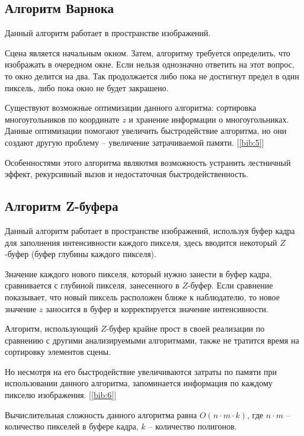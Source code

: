 	\subsection{Алгоритм Варнока}
	\par Данный алгоритм работает в пространстве изображений.
	\par Сцена является начальным окном. Затем, алгоритму требуется определить, что изображать в очередном окне. Если нельзя однозначно ответить на этот вопрос, то окно делится на два. Так продолжается либо пока не достигнут предел в один пиксель, либо пока окно не будет закрашено.
	\par Существуют возможные оптимизации данного алгоритма: сортировка многоугольников по координате $z$ и хранение информации о многоугольниках. Данные оптимизации помогают увеличить быстродействие алгоритма, но они создают другую проблему -- увеличение затрачиваемой памяти. [\ref{bib:5}]
	\par Особенностями этого алгоритма являютмя возможность устранить лестничный эффект, рекурсивный вызов и недостаточная быстродейственность.

	\subsection{Алгоритм Z-буфера}
	\par Данный алгоритм работает в пространстве изображений, используя буфер
кадра для заполнения интенсивности каждого пикселя, здесь вводится
некоторый $Z$-буфер (буфер глубины каждого пикселя).
	\par Значение каждого нового пикселя, который нужно занести в буфер кадра,
сравнивается с глубиной пикселя, занесенного в $Z$-буфер. Если сравнение
показывает, что новый пиксель расположен ближе к наблюдателю, то новое
значение $z$ заносится в буфер и корректируется значение интенсивности.
	\par Алгоритм, использующий $Z$-буфер крайне прост в своей реализации по
сравнению с другими анализируемыми алгоритмами, также не тратится время
на сортировку элементов сцены.
	\par Но несмотря на его быстродействие увеличиваются затраты по памяти при
использовании данного алгоритма, запоминается информация по каждому
пикселю изображения. [\ref{bib:6}]
\par Вычислительная сложность данного алгоритма равна 
\begin{math}
O(n\cdot m\cdot k)
\end{math}, где
\begin{math}
n\cdot m
\end{math} –
количество пикселей в буфере кадра, $k$ – количество полигонов.
